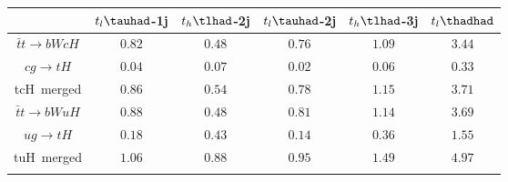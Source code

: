 \centering
\begin{tabular}{cccccc} \toprule\toprule
 & $t_{l}\tauhad$-1j & $t_{h}\tlhad$-2j & $t_{l}\tauhad$-2j & $t_{h}\tlhad$-3j & $t_{l}\thadhad$\\\midrule
$\bar{t}t\to bWcH$ & $0.82$ & $0.48$ & $0.76$ & $1.09$ & $3.44$\\
$cg\to tH$ & $0.04$ & $0.07$ & $0.02$ & $0.06$ & $0.33$\\
tcH~merged & $0.86$ & $0.54$ & $0.78$ & $1.15$ & $3.71$\\
$\bar{t}t\to bWuH$ & $0.88$ & $0.48$ & $0.81$ & $1.14$ & $3.69$\\
$ug\to tH$ & $0.18$ & $0.43$ & $0.14$ & $0.36$ & $1.55$\\
tuH~merged & $1.06$ & $0.88$ & $0.95$ & $1.49$ & $4.97$\\
\bottomrule\bottomrule\\
\end{tabular}
